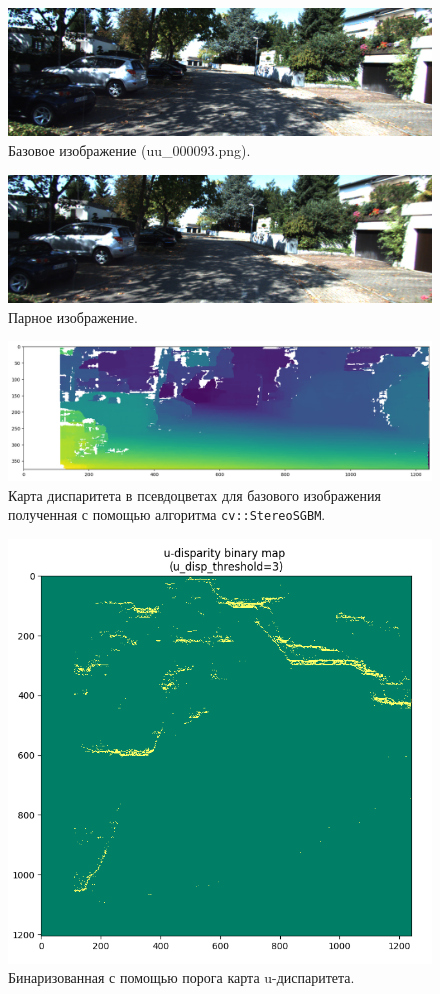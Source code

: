 \documentclass[oneside,final,12pt]{scrartcl}
\begin{document}
	\begin{figure}[p]
		\centering
		\includegraphics[width=0.7\linewidth]{base_img.png}
		\caption{Базовое изображение (uu\_000093.png).}
		\label{fig:base_img}
	\end{figure}

	\begin{figure}[p]
		\centering
		\includegraphics[width=0.7\linewidth]{pair_img.png}
		\caption{Парное изображение.}
		\label{fig:pair_img}
	\end{figure}

	\begin{figure}[p]
		\centering
		\includegraphics[width=0.75\linewidth]{disp_img.png}
		\caption{Карта диспаритета в псевдоцветах для базового изображения полученная с помощью алгоритма \texttt{cv::StereoSGBM}.}
		\label{fig:disp_img}
	\end{figure}

	\begin{figure}[p]
		\centering
		\includegraphics[width=0.7\linewidth]{u_disp.png}
		\caption{Бинаризованная с помощью порога карта u-диспаритета.}
		\label{fig:u_disp}
	\end{figure}
\end{document}
